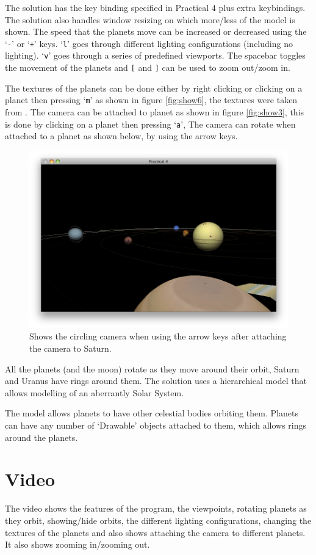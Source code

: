 \clearpage
The solution has the key binding specified in Practical 4  plus extra keybindings. The solution also handles window resizing on which more/less of the model is shown. The speed that the planets move can be increased or decreased using the `\texttt{-}' or `\texttt{+}' keys. `\texttt{l}' goes through different lighting configurations (including no lighting). `\texttt{v}' goes through a series of predefined viewports. The spacebar toggles the movement of the planets and  \texttt{[} and \texttt{]} can be used to zoom out/zoom in.
 
The textures of the planets can be done either by right clicking or clicking on a planet then pressing `\texttt{m}' as shown in figure \ref{fig:show6}, the textures were taken from \cite{pp} . The camera can be attached to planet as shown in figure \ref{fig:show3}, this is done by clicking on a planet then pressing `\texttt{a}', The camera can rotate when attached to a planet as shown below, by using the arrow keys. 

	\begin{figure}[htbp]
		\centering
			\includegraphics[scale=0.4]{figures/a.png}
		\caption{Shows the circling camera when using the arrow keys after attaching the camera to Saturn. }
		\label{fig:main}
	\end{figure}

All the planets (and the moon) rotate as they move around their orbit, Saturn and Uranus have rings around them. The solution uses a hierarchical model that allows modelling of an aberrantly Solar System.  

The model allows planets to have other celestial bodies orbiting them. Planets can have any number of `Drawable' objects attached to them, which allows rings around the planets.

\section{Video} %
\label{sec:video}
The video shows the features of the program, the viewpoints, rotating planets as they orbit, showing/hide orbits, the different lighting configurations, changing the textures of the planets and also shows attaching the camera to different planets. It also shows zooming in/zooming out. 


